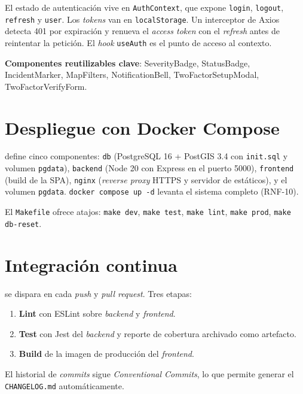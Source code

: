 El estado de autenticación vive en \texttt{AuthContext}, que expone \texttt{login}, \texttt{logout}, \texttt{refresh} y \texttt{user}. Los \textit{tokens} van en \texttt{localStorage}. Un interceptor de Axios detecta 401 por expiración y renueva el \textit{access token} con el \textit{refresh} antes de reintentar la petición. El \textit{hook} \texttt{useAuth} es el punto de acceso al contexto.

\textbf{Componentes reutilizables clave}: SeverityBadge, StatusBadge, IncidentMarker, MapFilters, NotificationBell, TwoFactorSetupModal, TwoFactorVerifyForm.


\section{Despliegue con Docker Compose}
\label{sec:despliegue}

 define cinco componentes: \texttt{db} (PostgreSQL 16 + PostGIS 3.4 con \texttt{init.sql} y volumen \texttt{pgdata}), \texttt{backend} (Node 20 con Express en el puerto 5000), \texttt{frontend} (build de la SPA), \texttt{nginx} (\textit{reverse proxy} HTTPS y servidor de estáticos), y el volumen \texttt{pgdata}. \texttt{docker compose up -d} levanta el sistema completo (RNF-10).

El \texttt{Makefile} ofrece atajos: \texttt{make dev}, \texttt{make test}, \texttt{make lint}, \texttt{make prod}, \texttt{make db-reset}.


\section{Integración continua}
\label{sec:cicd}

 se dispara en cada \textit{push} y \textit{pull request}. Tres etapas:

\begin{enumerate}
  \item \textbf{Lint} con ESLint sobre \textit{backend} y \textit{frontend}.
  \item \textbf{Test} con Jest del \textit{backend} y reporte de cobertura archivado como artefacto.
  \item \textbf{Build} de la imagen de producción del \textit{frontend}.
\end{enumerate}

El historial de \textit{commits} sigue \textit{Conventional Commits}, lo que permite generar el \texttt{CHANGELOG.md} automáticamente.


